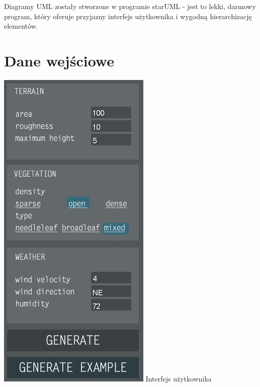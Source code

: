 \documentclass[a4paper, 11pt]{article}
\begin{document}
	Diagramy UML zostały stworzone w programie starUML - jest to lekki, darmowy program, który oferuje przyjazny interfejs użytkownika i wygodną hierarchizację elementów.
	
	
	\section*{Dane wejściowe}
	\indent
	
	\noindent\begin{minipage}{0.4\textwidth}%
		\includegraphics[width=\linewidth]{GUI}
		Interfejs użytkownika
	\end{minipage}%
\end{document}
